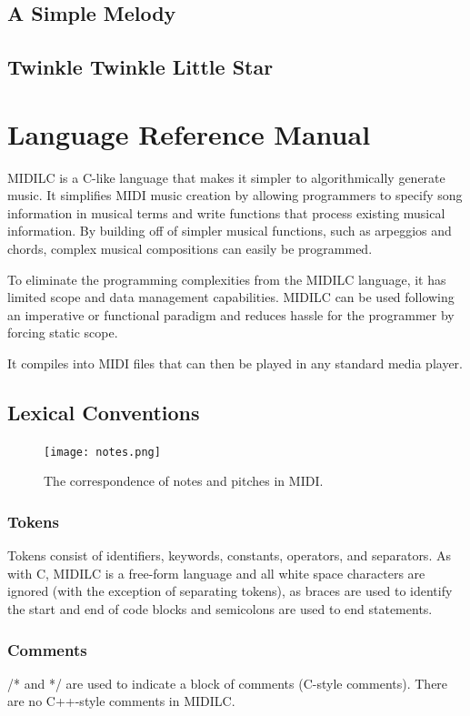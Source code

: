 \documentclass[12pt,A4]{book}
\begin{document}
\section{A Simple Melody}
\section{Twinkle Twinkle Little Star}
\chapter{Language Reference Manual}

MIDILC is a C-like language that makes it simpler to algorithmically generate music.  It simplifies MIDI music creation by allowing programmers to specify song information in musical terms and write functions that process existing musical information.  By building off of simpler musical functions, such as arpeggios and chords, complex musical compositions can easily be programmed.

To eliminate the programming complexities from the MIDILC language, it has limited scope and data management capabilities.  MIDILC can be used following an imperative or functional paradigm and reduces hassle for the programmer by forcing static scope.

It compiles into MIDI files that can then be played in any standard media player.

\section{Lexical Conventions}
\begin{figure}
\center
\texttt{[image: notes.png]}
\label{fig:pitches_and_notes}
\caption{The correspondence of notes and pitches in MIDI. }
\end{figure}
\subsection{Tokens}
Tokens consist of identifiers, keywords, constants, operators, and separators.  As with C, MIDILC is a free-form language and all white space characters are ignored (with the exception of separating tokens), as braces are used to identify the start and end of code blocks and semicolons are used to end statements.
\subsection{Comments}
/* and */ are used to indicate a block of comments (C-style comments).  There are no C++-style comments in MIDILC.
\end{document}
